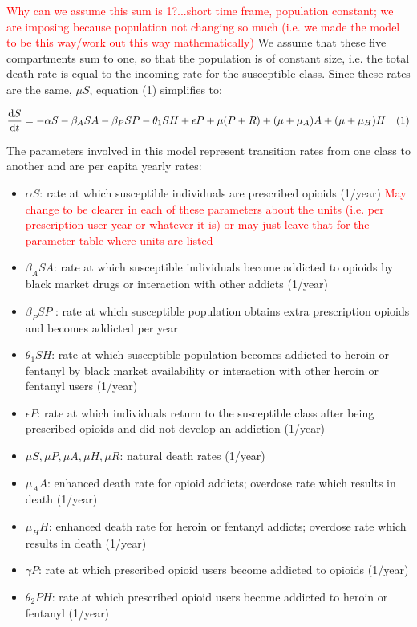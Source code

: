 \documentclass[12pt]{article}
\begin{document}
\textcolor{red}{Why can we assume this sum is 1?...short time frame, population constant; we are imposing because population not changing so much (i.e. we made the model to be this way/work out this way mathematically)} We assume that these five compartments sum to one, so that the population is of constant size, i.e. the total death rate is equal to the incoming rate for the susceptible class.  Since these rates are the same, $\mu S$, equation (1) simplifies to: 

\[\dv{S}{t} = -\alpha S - \beta_{A} SA  -\beta_{P} SP- \theta_{1} SH +\epsilon P +\mu (P+R)+ (\mu + \mu_{A})A + (\mu+\mu_{H}) H \quad (1)\] 


The parameters involved in this model represent transition rates from one class to another and are per capita yearly rates:
\begin{itemize}
\item $\alpha S$: rate at which susceptible individuals are prescribed opioids (1/year) \textcolor{red}{May change to be clearer in each of these parameters about the units (i.e. per prescription user year or whatever it is) or may just leave that for the parameter table where units are listed}
\item $\beta_{A} SA$: rate at which susceptible individuals become addicted to opioids by black market drugs or interaction with other addicts (1/year)
\item $\beta_{P} SP$ : rate at which susceptible population obtains extra prescription opioids and becomes addicted  per year
\item $\theta_1 SH$: rate at which susceptible population becomes addicted to heroin or fentanyl by black market availability or interaction with other heroin or fentanyl users  (1/year)
\item $\epsilon P$: rate at which individuals return to the susceptible class after being prescribed opioids and did not develop an addiction (1/year) 
\item $\mu S, \mu P, \mu A, \mu H, \mu R$: natural death rates (1/year)
\item $\mu_A A$: enhanced death rate for opioid addicts; overdose rate which results in death (1/year)
\item $\mu_H H$: enhanced death rate for heroin or fentanyl addicts; overdose rate which results in death (1/year)
\item $\gamma P$: rate at which prescribed opioid users become addicted to opioids (1/year)
\item $\theta_2 PH$: rate at which prescribed opioid users become addicted to heroin or fentanyl (1/year)

\end{itemize}
\end{document}
